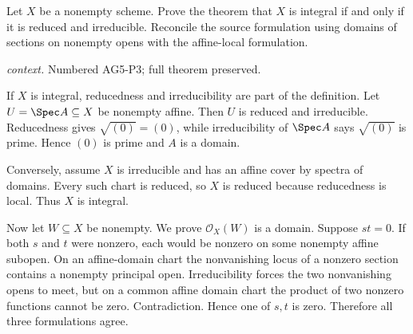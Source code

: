\begin{problem}\label{prob:vi27-p01}
Let \(X\) be a nonempty scheme. Prove the theorem that \(X\) is integral if and only if it is reduced and irreducible. Reconcile the source formulation using domains of sections on nonempty opens with the affine-local formulation.
\par\smallskip\noindent\textit{context.} Numbered AG5-P3; full theorem preserved.
\end{problem}

\ifdefined\FullProblemDossiers
\begin{solution}
If \(X\) is integral, reducedness and irreducibility are part of the definition. Let
\(U=\Spec A\subseteq X\) be nonempty affine. Then \(U\) is reduced and irreducible. Reducedness gives
\(\sqrt{(0)}=(0)\), while irreducibility of \(\Spec A\) says \(\sqrt{(0)}\) is prime. Hence \((0)\) is prime and
\(A\) is a domain.

Conversely, assume \(X\) is irreducible and has an affine cover by spectra of domains. Every such chart is reduced,
so \(X\) is reduced because reducedness is local. Thus \(X\) is integral.

Now let \(W\subseteq X\) be nonempty. We prove \(\mathcal O_X(W)\) is a domain. Suppose \(st=0\). If both \(s\)
and \(t\) were nonzero, each would be nonzero on some nonempty affine subopen. On an affine-domain chart the
nonvanishing locus of a nonzero section contains a nonempty principal open. Irreducibility forces the two
nonvanishing opens to meet, but on a common affine domain chart the product of two nonzero functions cannot be
zero. Contradiction. Hence one of \(s,t\) is zero. Therefore all three formulations agree.
\end{solution}
\fi
